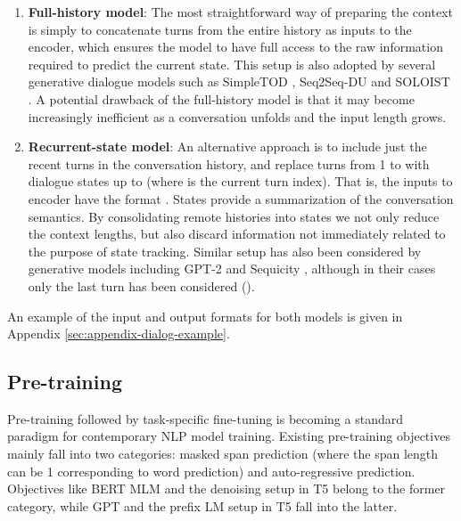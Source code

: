 \documentclass[11pt]{article}
\begin{document}
\begin{enumerate}
    \item \textbf{Full-history model}: The most straightforward way of preparing the context is simply to concatenate turns from the entire history as inputs to the encoder, which ensures the model to have full access to the raw information required to predict the current state. This setup is also adopted by several generative dialogue models such as SimpleTOD \cite{hosseiniasl2020simple}, Seq2Seq-DU \cite{feng2020sequencetosequence} and SOLOIST \cite{peng2021soloist}. A potential drawback of the full-history model is that it may become increasingly inefficient as a conversation unfolds and the input length grows.

\item \textbf{Recurrent-state model}: An alternative approach is to include just the  recent turns in the conversation history, and replace turns from 1 to  with dialogue states up to  (where  is the current turn index). That is, the inputs to encoder have the format . States provide a summarization of the conversation semantics. By consolidating remote histories into states we not only reduce the context lengths, but also discard information not immediately related to the purpose of state tracking. Similar setup has also been considered by generative models including GPT-2 \cite{budzianowski-vulic-2019-hello} and Sequicity \cite{lei-etal-2018-sequicity}, although in their cases only the last turn has been considered ().
\end{enumerate}

An example of the input and output formats for both models is given in Appendix \ref{sec:appendix-dialog-example}.

\subsection{Pre-training}
Pre-training followed by task-specific fine-tuning is becoming a standard paradigm for contemporary NLP model training. Existing pre-training objectives mainly fall into two categories: masked span prediction (where the span length can be 1 corresponding to word prediction) and auto-regressive prediction. Objectives like BERT MLM \cite{devlin-etal-2019-bert} and the denoising setup in T5 \cite{raffel20exploring} belong to the former category, while GPT \cite{radford2019language,NEURIPS2020_1457c0d6} and the prefix LM setup in T5 fall into the latter.
\end{document}
